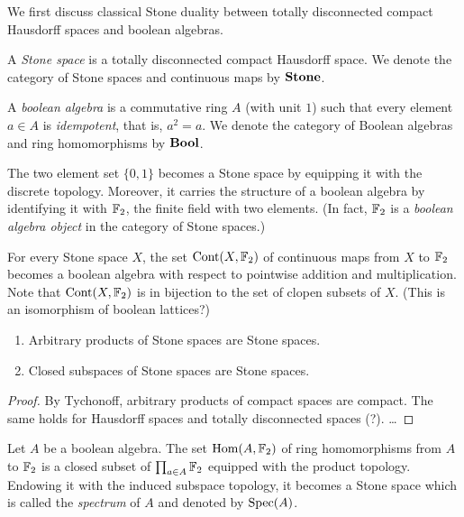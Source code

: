 \documentclass{notes}
\begin{document}
{\lukas
We first discuss classical Stone duality between totally disconnected compact Hausdorff spaces and boolean algebras.

\begin{definition}
  A \emph{Stone space} is a totally disconnected compact Hausdorff space.
  We denote the category of Stone spaces and continuous maps by \(\mathbf{Stone}\).
\end{definition}

\begin{definition}
  A \emph{boolean algebra} is a commutative ring \(A\) (with unit \(1\)) such that every element \(a\in A\) is \emph{idempotent}, that is, \(a^2=a\).
  We denote the category of Boolean algebras and ring homomorphisms by \(\mathbf{Bool}\).
\end{definition}

\begin{example}
  The two element set \(\{0,1\}\) becomes a Stone space by equipping it with the discrete topology.
  Moreover, it carries the structure of a boolean algebra by identifying it with \({\mathbb{F}}_2\), the finite field with two elements.
  (In fact, \({\mathbb{F}}_2\) is a \emph{boolean algebra object} in the category of Stone spaces.)
\end{example}

\begin{example}
  For every Stone space \(X\), the set \({\rm Cont}(X,{\mathbb{F}}_2)\) of continuous maps from \(X\) to \({\mathbb{F}}_2\) becomes a boolean algebra with respect to pointwise addition and multiplication.
  Note that \({\rm Cont}(X,{\mathbb{F}}_2)\) is in bijection to the set of clopen subsets of \(X\).
  (This is an isomorphism of boolean lattices?)
\end{example}

\begin{lemma}
  \leavevmode
  \begin{enumerate}
    \item
      Arbitrary products of Stone spaces are Stone spaces.
    \item
      Closed subspaces of Stone spaces are Stone spaces.
  \end{enumerate}
\end{lemma}
\begin{proof}
  By Tychonoff, arbitrary products of compact spaces are compact.
  The same holds for Hausdorff spaces and totally disconnected spaces (?).
  \dots
\end{proof}

\begin{example}
  Let \(A\) be a boolean algebra.
  The set \(\mathrm{Hom}(A,{\mathbb{F}}_2)\) of ring homomorphisms from \(A\) to \({\mathbb{F}}_2\) is a closed subset of \(\prod_{a\in A}{\mathbb{F}}_2\) equipped with the product topology.
  Endowing it with the induced subspace topology, it becomes a Stone space which is called the \emph{spectrum} of \(A\) and denoted by \(\operatorname{Spec}(A)\).


\end{example}}
\end{document}
